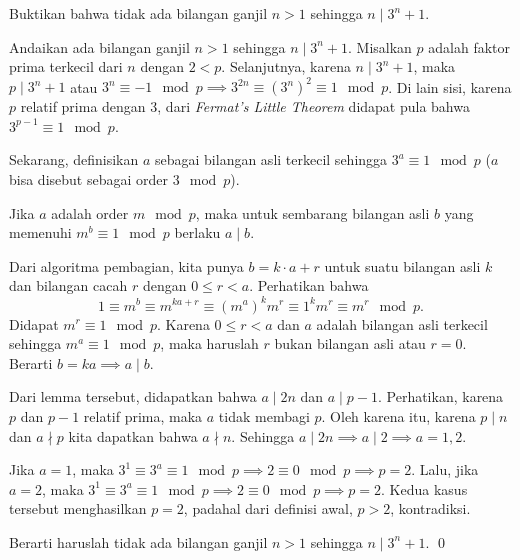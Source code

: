 \documentclass[12pt]{scrartcl}
\begin{document}
	\newpage
	\begin{soalbaru}
		Buktikan bahwa tidak ada bilangan ganjil $n > 1$ sehingga $n \mid 3^n+1$.\\[-10pt]
	\end{soalbaru}
	\begin{solusi}
	Andaikan ada bilangan ganjil $n>1$ sehingga $n \mid 3^n+1$.
	Misalkan $p$ adalah faktor prima terkecil dari $n$ dengan $2< p$. Selanjutnya, karena $n \mid 3^n+1$, maka $p \mid 3^n+1$ atau $3^n \equiv -1 \mod p \implies 3^{2n} \equiv (3^n)^2 \equiv 1 \mod p$. Di lain sisi, karena $p$ relatif prima dengan 3, dari \textit{ Fermat's Little Theorem }didapat pula bahwa $3^{p-1} \equiv 1 \mod p$.
	
	Sekarang, definisikan $a$ sebagai bilangan asli terkecil sehingga $3^a \equiv 1 \mod p$ ($a$ bisa disebut sebagai order $3 \mod p$). 
	\begin{lemmarev}
		Jika $a$ adalah order $m\mod p$, maka untuk sembarang bilangan asli $b$ yang memenuhi $m^b \equiv 1 \mod p$ berlaku $a\mid b$.
		\begin{buktilemma}
		Dari algoritma pembagian, kita punya $b=k\cdot a + r$ untuk suatu bilangan asli $k$ dan bilangan cacah $r$ dengan $0 \le r < a$. Perhatikan bahwa $$1 \equiv m^b \equiv m^{ka+r} \equiv (m^a)^km^r \equiv 1^km^r \equiv m^r \mod p.$$ Didapat $m^r \equiv 1 \mod p$. Karena $0 \le r < a$ dan $a$ adalah bilangan asli terkecil sehingga $m^a \equiv 1 \mod p$, maka haruslah $r$ bukan bilangan asli atau $r=0$. Berarti $b=ka \implies a \mid b$.
		\end{buktilemma}
	\end{lemmarev}
	Dari lemma tersebut, didapatkan bahwa $a \mid 2n$ dan $a \mid p-1$. Perhatikan, karena $p$ dan $p-1$ relatif prima, maka $a$ tidak membagi $p$. Oleh karena itu, karena $p \mid n$ dan $a \nmid p$ kita dapatkan bahwa $a \nmid n$. Sehingga $a \mid 2n \implies a \mid 2 \implies a=1,2$.
	
	Jika $a=1$, maka $3^1 \equiv 3^a \equiv 1 \mod p \implies 2 \equiv 0 \mod p \implies p = 2$. Lalu, jika $a=2$, maka $3^1 \equiv 3^a \equiv 1 \mod p \implies 2 \equiv 0 \mod p \implies p = 2$. Kedua kasus tersebut menghasilkan $p=2$, padahal dari definisi awal, $p > 2$, kontradiksi.
	
	Berarti haruslah tidak ada bilangan ganjil $n>1$ sehingga $n \mid 3^n+1$. \qed
	\end{solusi}
\end{document}
